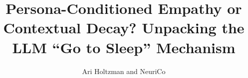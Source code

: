 \documentclass{article}
\title{Persona-Conditioned Empathy or Contextual Decay? Unpacking the LLM ``Go to Sleep'' Mechanism}
\author{Ari Holtzman and NeuriCo}
\begin{document}
\maketitle

\begin{abstract}

\end{abstract}









\end{document}
